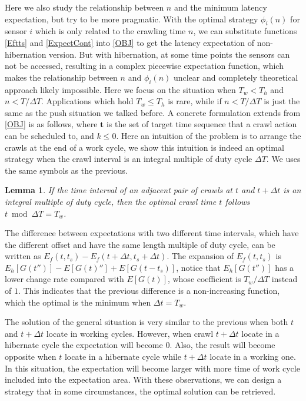 \documentclass[conference]{IEEEtran}
\newtheorem{lemma}{Lemma}
\begin{document}
Here we also study the relationship between $n$ and the minimum latency expectation, but try to be more pragmatic.
With the optimal strategy $\phi_i(n)$ for sensor $i$ which is only related to the crawling time $n$, we can substitute functions \eqref{Eftts} and \eqref{ExpectCont} into \eqref{OBJ} to get the latency expectation of non-hibernation version. 
But with hibernation, at some time points the sensors can not be accessed, resulting in a complex piecewise expectation function, which makes the relationship between $n$ and $\phi_i(n)$ unclear and completely theoretical approach likely impossible.
Here we focus on the situation when $T_w<T_h$ and $n<T/\Delta T$. Applications which hold $T_w\leq T_h$ is rare, while if $n<T/\Delta T$ is just the same as the push situation we talked before.
A concrete formulation extends from \ref{OBJ} is as follows, where $\mathbf{t}$ is the set of target time sequence that a crawl action can be scheduled to, and $k\leq 0$.
Here an intuition of the problem is to arrange the crawls at the end of a work cycle, we show this intuition is indeed an optimal strategy when the crawl interval is an integral multiple of duty cycle $\Delta T$. We uses the same symbols as the previous.

\begin{lemma}
\label{intopt}
If the time interval of an adjacent pair of crawls at $t$ and $t+\Delta t$ is an integral multiple of duty cycle, then the optimal crawl time $t$ follows $t\bmod \Delta T=T_w$.
\end{lemma}

\begin{IEEEproof}
The difference between expectations with two different time intervals, which have the different offset and have the same length multiple of duty cycle, can be written as $E_f(t, t_s)-E_f(t+\Delta t, t_s+\Delta t)$. 
The expansion of $E_f(t,t_s)$ is $E_h[G(t'')]-E[G(t)'']+E[G(t-t_s)]$, notice that $E_h[G(t'')]$ has a lower change rate compared with $E[G(t)]$, whose coefficient is $T_w/\Delta T$ instead of $1$. This indicates that the previous difference is a non-increasing function, which the optimal is the minimum when $\Delta t =T_w$.
\end{IEEEproof}


The solution of the general situation is very similar to the previous when both $t$ and $t+\Delta t$ locate in working cycles. However, when crawl $t+\Delta t$  locate in a hibernate cycle the expectation will become $0$. Also, the result will become opposite when $t$ locate in a hibernate cycle while $t+\Delta t$ locate in a working one. In this situation, the expectation will become larger with more time of work cycle included into the expectation area. 
With these observations, we can design a strategy that in some circumstances, the optimal solution can be retrieved.
\end{document}
